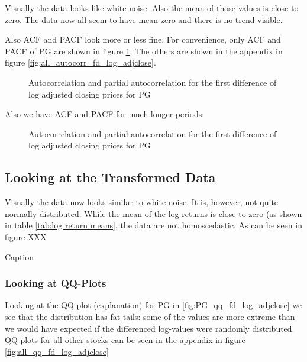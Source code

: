 Visually the data looks like white noise. Also the mean of those values is close to zero. The data now all seem to have mean zero and there is no trend visible. 


Also ACF and PACF look more or less fine. For convenience, only ACF and PACF of PG are shown in figure \ref{fig:PG_autocorr_fd_log_adjclose}. The others are shown in the appendix in figure \ref{fig:all_autocorr_fd_log_adjclose}.
\begin{figure}[H]
    \centering
    \begin{adjustbox}{width=.9\textwidth,center}
    
    \end{adjustbox}  
    \caption{Autocorrelation and partial autocorrelation for the first difference of log adjusted closing prices for PG}
    \label{fig:PG_autocorr_fd_log_adjclose}
\end{figure}{}

Also we have ACF and PACF for much longer periods: 
\begin{figure}[H]
    \centering
    \begin{adjustbox}{width=.9\textwidth,center}
    
    \end{adjustbox}  
    \caption{Autocorrelation and partial autocorrelation for the first difference of log adjusted closing prices for PG}
    \label{fig:PG_autocorr_fd_log_adjclose_all_lags}
\end{figure}{}



\subsection{Looking at the Transformed Data}
Visually the data now looks similar to white noise. It is, however, not quite normally distributed. While the mean of the log returns is close to zero (as shown in table \ref{tab:log return means}, the data are not homoscedastic. As can be seen in figure XXX

\begin{table}[h!]
    \centering
    \begin{adjustbox}{width = \linewidth}
    
    \end{adjustbox}
    \caption{Caption}
    \label{tab:log return means}
\end{table}{}


\subsubsection*{Looking at QQ-Plots}
Looking at the QQ-plot (explanation) for PG in \ref{fig:PG_qq_fd_log_adjclose} we see that the distribution has fat tails: some of the values are more extreme than we would have expected if the differenced log-values were randomly distributed. QQ-plots for all other stocks can be seen in the appendix in figure \ref{fig:all_qq_fd_log_adjclose}

